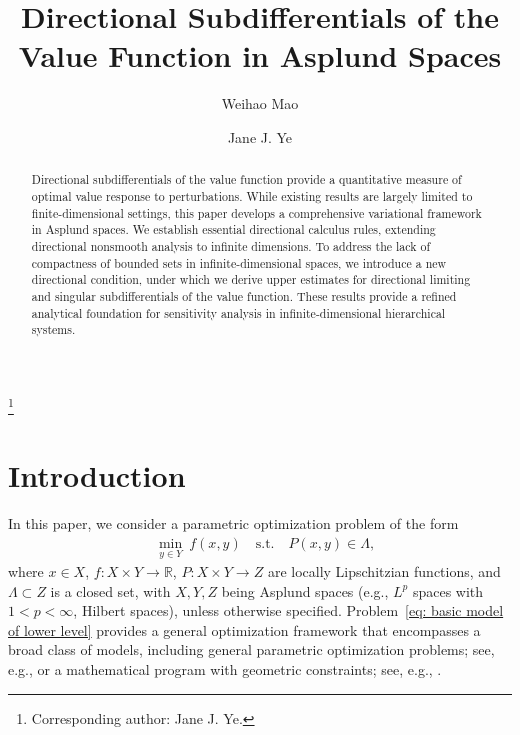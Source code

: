 \documentclass[12pt,twoside,reqno]{amsart}
\theoremstyle{definition}
\numberwithin{equation}{section}
\begin{document}
\title[Directional Subdifferentials of the Value Function] 
{Directional Subdifferentials of the Value Function in Asplund Spaces}

\author[W. Mao]{Weihao Mao}
\address{Department of Mathematics and Statistics, University of Victoria, Victoria, BC V8W 2Y2, Canada}

\author[J. J. Ye]{Jane J. Ye}
\address{Department of Mathematics and Statistics, University of Victoria, Victoria, BC V8W 2Y2, Canada}
\thanks{Corresponding author: Jane J. Ye.}


\begin{abstract}
Directional subdifferentials of the value function provide a quantitative measure of optimal value response to perturbations. While existing results are largely limited to finite-dimensional settings, this paper develops a comprehensive variational framework in Asplund spaces. We establish essential directional calculus rules, extending directional nonsmooth analysis to infinite dimensions. 
To address the lack of compactness of bounded sets in infinite-dimensional spaces, we introduce a new directional condition, under which we derive upper estimates for directional limiting and singular subdifferentials of the value function. These results provide a refined analytical foundation for sensitivity analysis in infinite-dimensional hierarchical systems. 
\end{abstract}

\maketitle

\section{Introduction}

In this paper, we consider a parametric optimization problem of the form 
\begin{equation}\label{eq: basic model of lower level}
    \begin{split}
        &\min_{y \in Y}~f(x,y)\quad \text{s.t.}\quad P(x,y)\in \Lambda,
    \end{split}
\end{equation}
where $x\in X$, $f:X\times Y\to \mathbb{R}$, $P:X\times Y\to Z$ are locally Lipschitzian functions, and $\Lambda\subset Z$ is a closed set, with $X,Y,Z$ being Asplund spaces (e.g., $L^p$ spaces with $1<p<\infty$, Hilbert spaces), unless otherwise specified.   Problem~\eqref{eq: basic model of lower level} provides a general optimization framework that encompasses a broad class of models, including general parametric optimization problems; see, e.g., \cite{bonnans2013perturbation} or a mathematical program with geometric constraints; see, e.g., \cite{guo2013mathematical}.  
\end{document}
